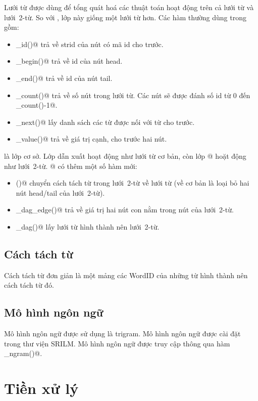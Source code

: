 \documentclass[a4paper,oneside,14pt]{extbook} %
\begin{document}
Lưới từ \verb@DAG@ được dùng để tổng quát hoá các thuật toán hoạt động
trên cả lưới từ và lưới~2-từ. So với \verb@Lattice@, lớp này giống một
lưới từ hơn. Các hàm thường dùng trong \verb@DAG@ gồm:
\begin{itemize}
\item \verb@node_id()@ trả về strid của nút có mã id cho trước.
\item \verb@node_begin()@ trả về id của nút head.
\item \verb@node_end()@ trả về id của nút tail.
\item \verb@node_count()@ trả về số nút trong lưới từ. Các nút sẽ được
  đánh số id từ 0 đến \verb@node_count()-1@.
\item \verb@get_next()@ lấy danh sách các từ được nối với từ cho
  trước.
\item \verb@edge_value()@ trả về giá trị cạnh, cho trước hai nút.
\end{itemize}

\verb@DAG@ là lớp cơ sở. Lớp dẫn xuất \verb@WordDAG@ hoạt động như
lưới từ cơ bản, còn lớp @ hoặt động như lưới~2-từ.
@ có thêm một số hàm mới:
\begin{itemize}
\item \verb@demangle()@ chuyển cách tách từ trong lưới~2-từ về lưới từ
  (về cơ bản là loại bỏ hai nút head/tail của lưới~2-từ).
\item \verb@node_dag_edge()@ trả về giá trị hai nút con nằm trong nút
  của lưới~2-từ.
\item \verb@get_dag()@ lấy lưới từ hình thành nên lưới~2-từ.
\end{itemize}


\subsection{Cách tách từ}

Cách tách từ đơn giản là một mảng các WordID của những từ hình thành
nên cách tách từ đó.

\subsection{Mô hình ngôn ngữ}

Mô hình ngôn ngữ được sử dụng là trigram. Mô hình ngôn ngữ được cài
đặt trong thư viện SRILM. Mô hình ngôn ngữ được truy cập thông qua hàm
\verb@get_ngram()@. 

\section{Tiền xử lý}
\end{document}
